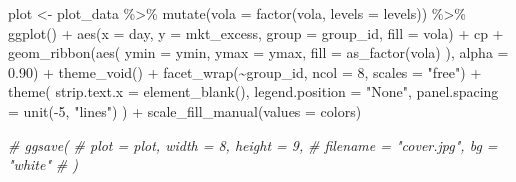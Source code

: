 \documentclass[
]{book}
\newenvironment{Shaded}{\begin{snugshade}}{\end{snugshade}}
\newcommand{\AttributeTok}[1]{\textcolor[rgb]{0.61,0.61,0.61}{#1}}
\newcommand{\CommentTok}[1]{\textcolor[rgb]{0.37,0.37,0.37}{\textit{#1}}}
\newcommand{\DecValTok}[1]{\textcolor[rgb]{0.06,0.06,0.06}{#1}}
\newcommand{\FloatTok}[1]{\textcolor[rgb]{0.06,0.06,0.06}{#1}}
\newcommand{\FunctionTok}[1]{\textcolor[rgb]{0,0,0}{#1}}
\newcommand{\NormalTok}[1]{#1}
\newcommand{\OtherTok}[1]{\textcolor[rgb]{0.37,0.37,0.37}{#1}}
\newcommand{\SpecialCharTok}[1]{\textcolor[rgb]{0,0,0}{#1}}
\newcommand{\StringTok}[1]{\textcolor[rgb]{0.5,0.5,0.5}{#1}}
\begin{document}
\begin{Shaded}
\begin{Highlighting}[]
\NormalTok{plot }\OtherTok{\textless{}{-}}\NormalTok{ plot\_data }\SpecialCharTok{\%\textgreater{}\%}
  \FunctionTok{mutate}\NormalTok{(}\AttributeTok{vola =} \FunctionTok{factor}\NormalTok{(vola, }\AttributeTok{levels =}\NormalTok{ levels)) }\SpecialCharTok{\%\textgreater{}\%}
  \FunctionTok{ggplot}\NormalTok{() }\SpecialCharTok{+}
  \FunctionTok{aes}\NormalTok{(}\AttributeTok{x =}\NormalTok{ day, }\AttributeTok{y =}\NormalTok{ mkt\_excess, }\AttributeTok{group =}\NormalTok{ group\_id, }\AttributeTok{fill =}\NormalTok{ vola) }\SpecialCharTok{+}
\NormalTok{  cp }\SpecialCharTok{+}
  \FunctionTok{geom\_ribbon}\NormalTok{(}\FunctionTok{aes}\NormalTok{(}
    \AttributeTok{ymin =}\NormalTok{ ymin,}
    \AttributeTok{ymax =}\NormalTok{ ymax,}
    \AttributeTok{fill =} \FunctionTok{as\_factor}\NormalTok{(vola)}
\NormalTok{  ), }\AttributeTok{alpha =} \FloatTok{0.90}\NormalTok{) }\SpecialCharTok{+}
  \FunctionTok{theme\_void}\NormalTok{() }\SpecialCharTok{+}
  \FunctionTok{facet\_wrap}\NormalTok{(}\SpecialCharTok{\textasciitilde{}}\NormalTok{group\_id, }\AttributeTok{ncol =} \DecValTok{8}\NormalTok{, }\AttributeTok{scales =} \StringTok{"free"}\NormalTok{) }\SpecialCharTok{+}
  \FunctionTok{theme}\NormalTok{(}
    \AttributeTok{strip.text.x =} \FunctionTok{element\_blank}\NormalTok{(),}
    \AttributeTok{legend.position =} \StringTok{"None"}\NormalTok{,}
    \AttributeTok{panel.spacing =} \FunctionTok{unit}\NormalTok{(}\SpecialCharTok{{-}}\DecValTok{5}\NormalTok{, }\StringTok{"lines"}\NormalTok{)}
\NormalTok{  ) }\SpecialCharTok{+}
  \FunctionTok{scale\_fill\_manual}\NormalTok{(}\AttributeTok{values =}\NormalTok{ colors)}

\CommentTok{\# ggsave(}
\CommentTok{\#   plot = plot, width = 8, height = 9,}
\CommentTok{\#   filename = "cover.jpg", bg = "white"}
\CommentTok{\# )}
\end{Highlighting}
\end{Shaded}


  

\printindex
\end{document}
